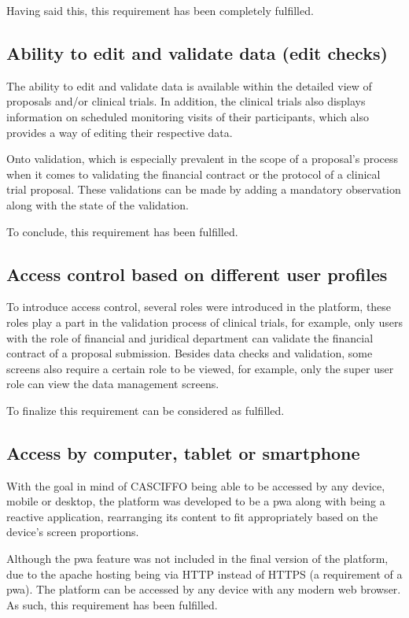 Having said this, this requirement has been completely fulfilled.

\subsection{Ability to edit and validate data (edit checks)}
The ability to edit and validate data is available within the detailed view of proposals and/or clinical trials. In addition, the clinical trials also displays information on scheduled monitoring visits of their participants, which also provides a way of editing their respective data.

Onto validation, which is especially prevalent in the scope of a proposal's process when it comes to validating the financial contract or the protocol of a clinical trial proposal. These validations can be made by adding a mandatory observation along with the state of the validation.

To conclude, this requirement has been fulfilled.

\subsection{Access control based on different user profiles}

To introduce access control, several roles were introduced in the platform, these roles play a part in the validation process of clinical trials, for example, only users with the role of financial and juridical department can validate the financial contract of a proposal submission. 
Besides data checks and validation, some screens also require a certain role to be viewed, for example, only the super user role can view the data management screens.

To finalize this requirement can be considered as fulfilled.

\subsection{Access by computer, tablet or smartphone}

With the goal in mind of CASCIFFO being able to be accessed by any device, mobile or desktop, the platform was developed to be a \acrshort{pwa} along with being a reactive application, rearranging its content to fit appropriately based on the device's screen proportions. 

Although the \acrshort{pwa} feature was not included in the final version of the platform, due to the apache hosting being via HTTP instead of HTTPS (a requirement of a \acrshort{pwa}). The platform can be accessed by any device with any modern web browser. As such, this requirement has been fulfilled.

